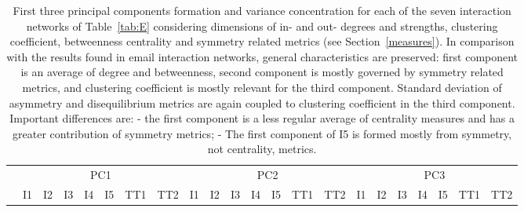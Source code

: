 \documentclass[%
 aip,
 jmp,%
 amsmath,amssymb,
 reprint,%
 floatfix,
]{revtex4-1}
\begin{document}
\begin{table}[!h]
	\caption{First three principal components formation and variance concentration for each of the seven interaction networks of Table~\ref{tab:E} considering dimensions of in- and out- degrees and strengths, clustering coefficient, betweenness centrality and symmetry related metrics (see Section~\ref{measures}). In comparison with the results found in email interaction networks, general characteristics are preserved: first component is an average of degree and betweenness, second component is mostly governed by symmetry related metrics, and clustering coefficient is mostly relevant for the third component. Standard deviation of asymmetry and disequilibrium metrics are again coupled to clustering coefficient in the third component. Important differences are: - the first component is a less regular average of centrality measures and has a greater contribution of symmetry metrics; - The first component of I5 is formed mostly from symmetry, not centrality, metrics.}
	\footnotesize
\begin{center}
\begin{tabular}{| l ||  c |c |c |c |c | c | c || c | c | c | c | c | c | c || c |c |c |c |c | c | c |	}\cline{2-22}
\multicolumn{1}{c|}{} & \multicolumn{7}{c||}{PC1}          & \multicolumn{7}{c||}{PC2} & \multicolumn{7}{c|}{PC3}  \\\cline{2-22}
	\multicolumn{1}{c|}{} & 
	I1 & I2 & I3 & I4 & I5 & TT1 & TT2 &
	I1 & I2 & I3 & I4 & I5 & TT1 & TT2 &
	I1 & I2 & I3 & I4 & I5 & TT1 & TT2 \\\hline
	
\hline
\end{tabular}
\end{center}
\label{tab:pcaE3}
\end{table}





%	
%	




\clearpage
\nocite{*}
\end{document}
